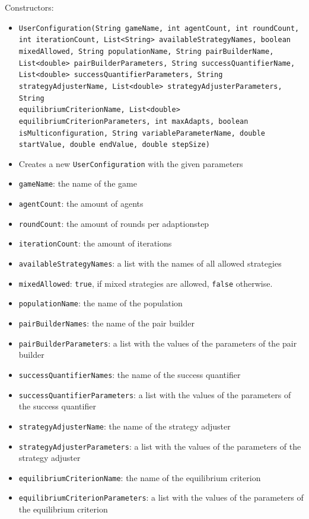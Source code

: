 \documentclass[parskip=full,11pt]{scrartcl}
\begin{document}
Constructors:
\begin{itemize}\itemsep -10pt
\item \texttt{UserConfiguration(String gameName, int agentCount, int roundCount, int iterationCount, List<String> availableStrategyNames, boolean mixedAllowed, String populationName, String pairBuilderName, List<double> pairBuilderParameters, String successQuantifierName, List<double> successQuantifierParameters, String strategyAdjusterName, List<double> strategyAdjusterParameters, String\\ equilibriumCriterionName, List<double> equilibriumCriterionParameters, int maxAdapts, boolean isMulticonfiguration, String variableParameterName, double startValue, double endValue, double stepSize)}
\item[] Creates a new \texttt{UserConfiguration} with the given parameters
\item[] \texttt{gameName}: the name of the game
\item[] \texttt{agentCount}: the amount of agents
\item[] \texttt{roundCount}: the amount of rounds per adaptionstep
\item[] \texttt{iterationCount}: the amount of iterations
\item[] \texttt{availableStrategyNames}: a list with the names of all allowed strategies
\item[] \texttt{mixedAllowed}: \texttt{true}, if mixed strategies are allowed, \texttt{false} otherwise.
\item[] \texttt{populationName}: the name of the population
\item[] \texttt{pairBuilderNames}: the name of the pair builder
\item[] \texttt{pairBuilderParameters}: a list with the values of the parameters of the pair builder
\item[] \texttt{successQuantifierNames}: the name of the success quantifier
\item[] \texttt{successQuantifierParameters}: a list with the values of the parameters of the success quantifier
\item[] \texttt{strategyAdjusterName}: the name of the strategy adjuster
\item[] \texttt{strategyAdjusterParameters}: a list with the values of the parameters of the strategy adjuster
\item[] \texttt{equilibriumCriterionName}: the name of the equilibrium criterion
\item[] \texttt{equilibriumCriterionParameters}: a list with the values of the parameters of the equilibrium criterion

\end{itemize}
\end{document}
